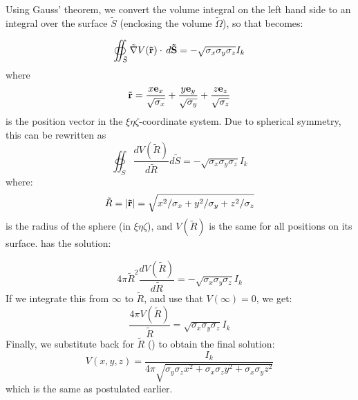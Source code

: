 Using Gauss' theorem, we convert the volume integral on the left hand side
to an integral over the surface $\tilde{S}$ (enclosing the volume $\tilde{\Omega}$), 
so that  becomes:

\begin{equation}
\oiint_{\tilde{S}} \tilde{\nabla}V({\bf \tilde{r}}) \cdot \, d{\bf \tilde{S}}  = -\sqrt{\sigma_x\sigma_y\sigma_z}I_k
\label{eq:AppC:berit1}
\end{equation}
where 
\begin{equation}
{\bf \tilde{r}} = \frac{x{\bf e}_x}{\sqrt{\sigma_x}} + \frac{y{\bf e}_y}{\sqrt{\sigma_y}}+\frac{z{\bf e}_z}{\sqrt{\sigma_z}}
\end{equation}
is the position vector in the $\xi\eta\zeta$-coordinate system. Due to spherical symmetry, this can be rewritten as
\begin{equation}
\oiint_{\tilde{S}} \frac{d V(\tilde{R})}{d\tilde{R}} d{\tilde{S}}  = -\sqrt{\sigma_x\sigma_y\sigma_z}I_k
\label{eq:AppC:berit1ogenhalv}
\end{equation}
where:
\begin{equation}
\tilde{R} = |{\bf \tilde{r}}| = \sqrt{x^2/\sigma_x + y^2/\sigma_y + z^2/\sigma_z}
\label{eq:AppC:R}
\end{equation}
is the radius of the sphere (in $\xi\eta\zeta$), and $V(\tilde{R})$ is the same for all positions on its surface. 
 has the solution:

\begin{equation}
4\pi \tilde{R}^2 \frac{d V(\tilde{R})}{d\tilde{R}} = -\sqrt{\sigma_x\sigma_y\sigma_z}I_k
\label{eq:AppC:berit2}
\end{equation}
If we integrate this from $\infty$ to $\tilde{R}$, and use that $V(\infty) = 0$, we get:
\begin{equation}
\frac{4\pi V (\tilde{R})}{\tilde{R}} = \sqrt{\sigma_x\sigma_y\sigma_z}I_k
\label{eq:AppC:berit3}
\end{equation}
Finally, we substitute back for $\tilde{R}$ () to obtain the final solution: 
\begin{equation}
V(x,y,z) = \frac{I_k}{4 \pi \sqrt{\sigma_y\sigma_z x^2 + \sigma_x\sigma_z y^2 + \sigma_x\sigma_y z^2}}
\label{eq:VC:berit3}
\end{equation}
which is the same as  postulated earlier. 
